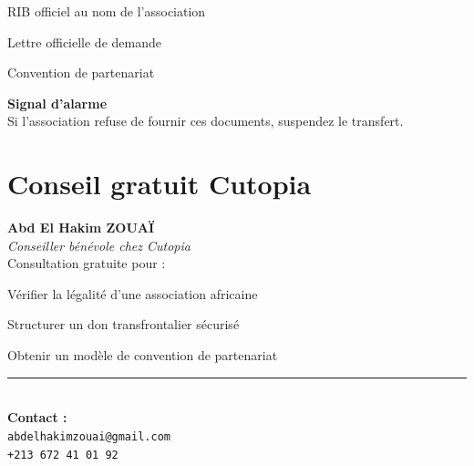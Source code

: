 \documentclass[12pt, a4paper]{article}
\begin{document}
\begin{tcolorbox}[colback=darkgray!5!white, colframe=darkgray!75!black, title=\textbf{Catégorie 4 : Documents bancaires}]
\begin{starredlist}
    \item RIB officiel au nom de l'association
    \item Lettre officielle de demande
    \item Convention de partenariat
\end{starredlist}
\end{tcolorbox}

\begin{alertbox}
    \centering
    \textbf{Signal d'alarme} \\
    Si l'association refuse de fournir ces documents, suspendez le transfert.
\end{alertbox}

\newpage

\section*{Conseil gratuit Cutopia}

\begin{conseilbox}
    \centering
    {\Large \textbf{Abd El Hakim ZOUAÏ}} \\[0.2cm]
    \textit{Conseiller bénévole chez Cutopia} \\[0.3cm]
    
    Consultation gratuite pour :
    \begin{starredlist}
        \item Vérifier la légalité d'une association africaine
        \item Structurer un don transfrontalier sécurisé
        \item Obtenir un modèle de convention de partenariat
    \end{starredlist}
    
    \vspace{0.3cm}
    \rule{0.7\textwidth}{0.3pt} \\[0.3cm]
    \textbf{Contact :} \\
    \texttt{abdelhakimzouai@gmail.com} \\[0.2cm]
    \texttt{+213 672 41 01 92}
\end{conseilbox}

\newpage

\end{document}

